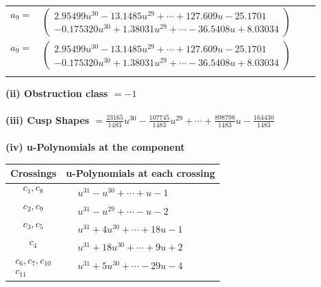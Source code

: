 \documentclass[1p]{elsarticle_modified}
\theoremstyle{definition}
\begin{document}
\begin{tabular}{m{7pt} m{180pt} m{7pt} m{180pt} }
\flushright $a_{9}=$&$\begin{pmatrix}2.95499 u^{30}-13.1485 u^{29}+\cdots+127.609 u-25.1701\\-0.175320 u^{30}+1.38031 u^{29}+\cdots-36.5408 u+8.03034\end{pmatrix}$\\ \flushright $a_{9}=$&$\begin{pmatrix}2.95499 u^{30}-13.1485 u^{29}+\cdots+127.609 u-25.1701\\-0.175320 u^{30}+1.38031 u^{29}+\cdots-36.5408 u+8.03034\end{pmatrix}$\\&\end{tabular}
\flushleft \textbf{(ii) Obstruction class $= -1$}\\~\\
\flushleft \textbf{(iii) Cusp Shapes $= \frac{23165}{1483} u^{30}-\frac{107745}{1483} u^{29}+\cdots+\frac{898798}{1483} u-\frac{164430}{1483}$}\\~\\
\newpage\renewcommand{\arraystretch}{1}
\flushleft \textbf{(iv) u-Polynomials at the component}\newline \\
\begin{tabular}{m{50pt}|m{274pt}}
Crossings & \hspace{64pt}u-Polynomials at each crossing \\
\hline $$\begin{aligned}c_{1},c_{8}\end{aligned}$$&$\begin{aligned}
&u^{31}- u^{30}+\cdots+u-1
\end{aligned}$\\
\hline $$\begin{aligned}c_{2},c_{9}\end{aligned}$$&$\begin{aligned}
&u^{31}- u^{29}+\cdots- u-2
\end{aligned}$\\
\hline $$\begin{aligned}c_{3},c_{5}\end{aligned}$$&$\begin{aligned}
&u^{31}+4 u^{30}+\cdots+18 u-1
\end{aligned}$\\
\hline $$\begin{aligned}c_{4}\end{aligned}$$&$\begin{aligned}
&u^{31}+18 u^{30}+\cdots+9 u+2
\end{aligned}$\\
\hline $$\begin{aligned}c_{6},c_{7},c_{10}\\c_{11}\end{aligned}$$&$\begin{aligned}
&u^{31}+5 u^{30}+\cdots-29 u-4
\end{aligned}$\\
\hline
\end{tabular}\\~\\
\end{document}
